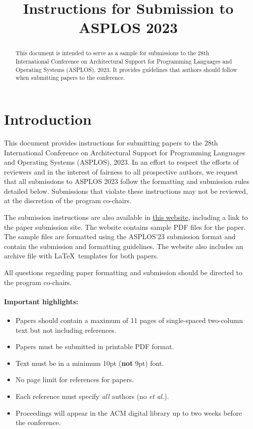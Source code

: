 \documentclass[pageno]{jpaper}
\begin{document}
\title{
Instructions for Submission to ASPLOS 2023}

\date{}
\maketitle

\thispagestyle{empty}

\begin{abstract}

This document is intended to serve as a sample for submissions to the
28th International Conference on Architectural Support for Programming
Languages and Operating Systems (ASPLOS), 2023.  It provides
guidelines that authors should follow when submitting papers to the
conference. 

\end{abstract}

\section{Introduction}

This document provides instructions for submitting papers to the 28th
International Conference on Architectural Support for Programming
Languages and Operating Systems (ASPLOS), 2023.  In an effort to
respect the efforts of reviewers and in the interest of fairness to
all prospective authors, we request that all submissions to ASPLOS
2023 follow the formatting and submission rules detailed below.
Submissions that violate these instructions may not be reviewed, at the
discretion of the program co-chairs.

The submission instructions are also available in
\href{https://asplos-conference.org/submissions/}{this website},
including a link to the paper submission site. The website contains
sample PDF files for the paper. The
sample files are formatted using the ASPLOS'23 submission format and
contain the submission and formatting guidelines. The website also
includes an archive file
with \LaTeX~templates for both papers.

All questions regarding paper formatting and submission should be directed
to the program co-chairs.


\paragraph{Important highlights:}
\begin{itemize}
\item Papers should contain a
maximum of 11 pages of single-spaced two-column text but not including
references.
\item Papers must be submitted in printable PDF format.
\item Text must be in a minimum 10pt ({\bf not} 9pt) font.
\item No page limit for references for papers.
\item Each reference must specify {\em all} authors (no {\em et al.}).
\item Proceedings will appear in the ACM digital library up to two weeks
before the conference.
\end{itemize}
\end{document}
